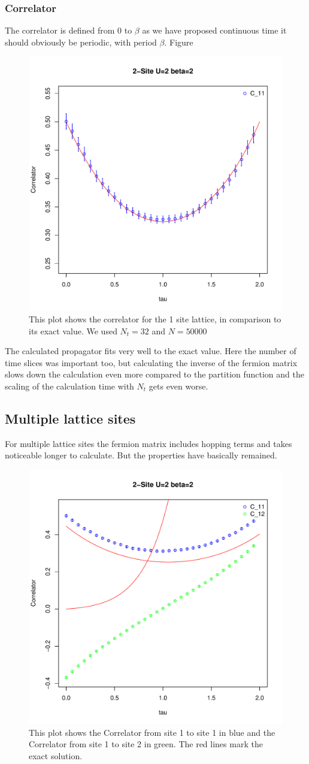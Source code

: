 \subsubsection{Correlator}
The correlator is defined from $0$ to $\beta$ as we have proposed continuous time it should obviously be periodic, with period $\beta$.
Figure 
\begin{figure}[H]
	\centering
	\includegraphics[width=0.5\linewidth]{figs/plot_C1t}
	\caption[Correlator 1 site]{This plot shows the correlator for the 1 site lattice, in comparison to its exact value. We used $N_t=32$ and $N=50000$}
	\label{fig:plotc1t}
\end{figure}
The calculated propagator fits very well to the exact value. Here the number of time slices was important too, but calculating the inverse of the fermion matrix slows down the calculation even more compared to the partition function and the scaling of the calculation time with $N_t$ gets even worse.
\subsection{Multiple lattice sites}
For multiple lattice sites the fermion matrix includes hopping terms and takes noticeable longer to calculate. But the properties have basically remained.

\begin{figure}[H]
	\centering
	\includegraphics[width=0.5\linewidth]{figs/plot_C2t}
	\caption[Correlator 2-site]{This plot shows the Correlator from site 1 to site 1 in blue and the Correlator from site 1 to site 2 in green. The red lines mark the exact solution.}
	\label{fig:plotc2t}
\end{figure}

